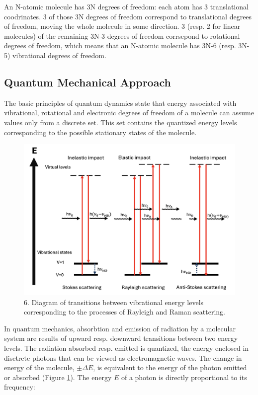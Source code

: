 \bigskip

An N-atomic molecule has 3N degrees of freedom: each atom has 3 translational coodrinates. 3 of those 3N degrees of freedom correspond to translational degrees of freedom, moving the whole molecule in some direction. 3 (resp. 2 for linear molecules) of the remaining 3N-3 degrees of freedom corrsepond to rotational degrees of freedom, which means that an N-atomic molecule has 3N-6 (resp. 3N-5) vibrational degrees of freedom. \cite{molecularvibration}

\newpage

\subsection{Quantum Mechanical Approach}

The basic principles of quantum dynamics state that energy associated with vibrational, rotational and electronic degrees of freedom of a molecule can assume values only from a discrete set. This set contains the quantized energy levels corresponding to the possible stationary states of the molecule.

\begin{figure}[h]
    \includegraphics[width=\textwidth]{images/theory/qm_scattering.png}
    \caption{6. Diagram of transitions between vibrational energy levels corresponding to the processes of Rayleigh and Raman scattering.}
    \label{fig:energy_model}
\end{figure}

In quantum mechanics, absorbtion and emission of radiation by a molecular system are results of upward resp. downward transitions between two energy levels. The radiation absorbed resp. emitted is quantized, the energy enclosed in disctrete photons that can be viewed as electromagnetic waves. The change in energy of the molecule, \(\pm\Delta E\), is equivalent to the energy of the photon emitted or absorbed (Figure \ref{fig:energy_model}). The energy \(E\) of a photon is directly proportional to its frequency:

